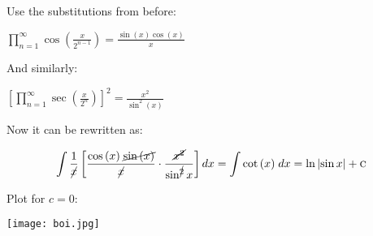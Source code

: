 \documentclass{article}
\begin{document}
Use the substitutions from before:
\begin{center}
        $ \prod_{n=1}^{\infty}  \cos{\left( \frac{x}{2^{n-1}}\right)} = \frac{\sin{(x)}\cos{(x)}}{x}$
\end{center}

And similarly:

\begin{center}
    $\left[ \prod_{n=1}^{\infty}\sec{\left( \frac{x}{2^n} \right)}  \right]^2 = \frac{x^2}{\sin^2{(x)}} $
\end{center}

Now it can be rewritten as:

\begin{equation}
        \int \frac{1}{\cancel{x}} \left[ \frac{\cos{(x)}\;\cancel{\sin{(x)}}}{\cancel{x}}\cdot\frac{\cancel{x^{2}}}{\sin^{\cancel{2}}{x}} \right] dx
        =\int{\cot{(x)}}\;dx = \ln{\left| \sin{x}\right|} + \textsc{c}
\end{equation}
\newline

Plot for $c = 0$:

\begin{center}
    \texttt{[image: boi.jpg]}
\end{center}
\end{document}
